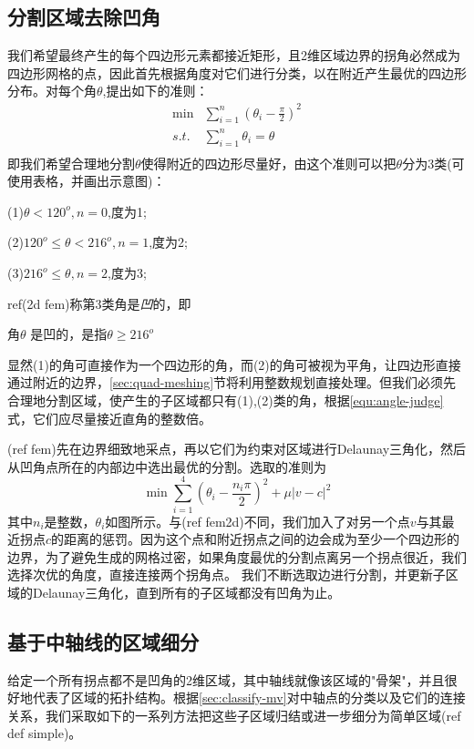 \subsection{分割区域去除凹角}\label{sec:cocavity-removal}
我们希望最终产生的每个四边形元素都接近矩形，且2维区域边界的拐角必然成为四边形网格的点，因此首先根据角度对它们进行分类，以在附近产生最优的四边形分布。对每个角$\theta$,提出如下的准则：
\begin{equation} \label{equ:angle-judge}
\begin{split}
\min  &{\sum_{i=1}^n(\theta_i-\frac{\pi}{2})^2}\\
s.t.\,  &\sum_{i=1}^{n}\theta_i=\theta\\
\end{split}
\end{equation}
即我们希望合理地分割$\theta$使得附近的四边形尽量好，由这个准则可以把$\theta$分为3类(可使用表格，并画出示意图)：
	
(1)$\theta < 120^o,n=0$,度为1;

(2)$120^o \leq \theta < 216^o,n=1$,度为2;

(3)$216^o \leq \theta,n=2$,度为3;

ref(2d fem)称第3类角是\emph{凹}的，即
\begin{definition}\label{def:concave}
	角$\theta$ 是凹的，是指$\theta \geq 216^o$
\end{definition}
显然(1)的角可直接作为一个四边形的角，而(2)的角可被视为平角，让四边形直接通过附近的边界，\ref{sec:quad-meshing}节将利用整数规划直接处理。但我们必须先合理地分割区域，使产生的子区域都只有(1),(2)类的角，根据\ref{equ:angle-judge}式，它们应尽量接近直角的整数倍。

(ref fem)先在边界细致地采点，再以它们为约束对区域进行Delaunay三角化，然后从凹角点所在的内部边中选出最优的分割。选取的准则为
\begin{equation} \label{equ:split-concave}
\min \sum_{i=1}^{4}(\theta_i-\frac{n_i\pi}{2})^2+\mu \left |v-c\right |^2
\end{equation}
其中$n_i$是整数，$\theta_i$如图所示。与(ref fem2d)不同，我们加入了对另一个点$v$与其最近拐点$c$的距离的惩罚。因为这个点和附近拐点之间的边会成为至少一个四边形的边界，为了避免生成的网格过密，如果角度最优的分割点离另一个拐点很近，我们选择次优的角度，直接连接两个拐角点。  
我们不断选取边进行分割，并更新子区域的Delaunay三角化，直到所有的子区域都没有凹角为止。
\subsection{基于中轴线的区域细分}\label{ma-prime}
给定一个所有拐点都不是凹角的2维区域，其中轴线就像该区域的"骨架"，并且很好地代表了区域的拓扑结构。根据\ref{sec:classify-mv}对中轴点的分类以及它们的连接关系，我们采取如下的一系列方法把这些子区域归结或进一步细分为简单区域(ref def simple)。

